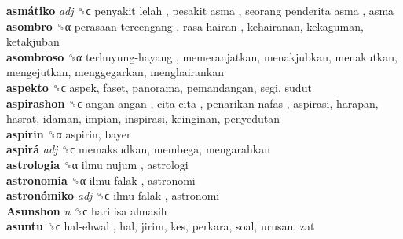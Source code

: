 \textbf{asmátiko} \emph{adj}  ␝ϲ   penyakit lelah ,  pesakit asma ,  seorang penderita asma , asma  \\
\textbf{asombro} ␝α   perasaan tercengang ,  rasa hairan , kehairanan, kekaguman, ketakjuban  \\
\textbf{asombroso} ␝α   terhuyung-hayang , memeranjatkan, menakjubkan, menakutkan, mengejutkan, menggegarkan, menghairankan  \\
\textbf{aspekto} ␝ϲ  aspek, faset, panorama, pemandangan, segi, sudut  \\
\textbf{aspirashon} ␝ϲ   angan-angan ,  cita-cita ,  penarikan nafas , aspirasi, harapan, hasrat, idaman, impian, inspirasi, keinginan, penyedutan  \\
\textbf{aspirin} ␝α  aspirin, bayer  \\
\textbf{aspirá} \emph{adj}  ␝ϲ  memaksudkan, membega, mengarahkan  \\
\textbf{astrologia} ␝α   ilmu nujum , astrologi  \\
\textbf{astronomia} ␝α   ilmu falak , astronomi  \\
\textbf{astronómiko} \emph{adj}  ␝ϲ   ilmu falak , astronomi  \\
\textbf{Asunshon} \emph{n}  ␝ϲ   hari isa almasih   \\
\textbf{asuntu} ␝ϲ   hal-ehwal , hal, jirim, kes, perkara, soal, urusan, zat  \\
